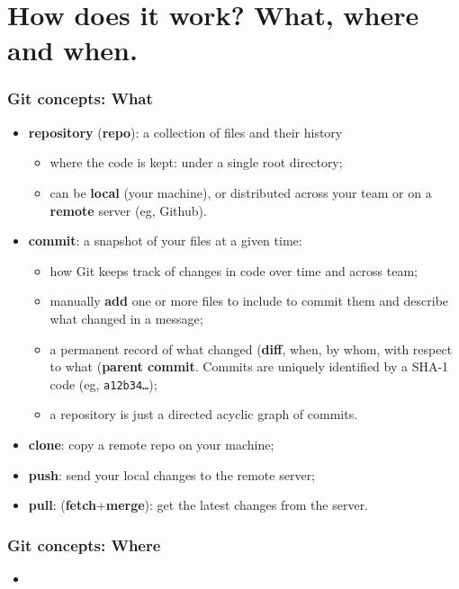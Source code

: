 \documentclass[10pt,svgnames]{beamer}
\begin{document}
\section{How does it work? What, where and when.}
\begin{frame}
\frametitle{Git concepts: What}
    
\begin{itemize}[<+->]
\item \textbf{repository} (\textbf{repo}): a collection of files and their history
\begin{itemize}
   \item where the code is kept: under a single root directory;
   \item can be \textbf{local} (your machine), or distributed across your team or on a \textbf{remote} server (eg, Github).
 \end{itemize}

\item \textbf{commit}: a snapshot of your files at a given time:
\begin{itemize}
  \item how Git keeps track of changes in code over time and across team;
  \item manually \textbf{add} one or more files to include to commit them and describe what changed in a message;
  \item a permanent record of what changed (\textbf{diff}, when, by whom, with respect to what (\textbf{parent commit}. Commits are uniquely identified by a SHA-1 code (eg, \texttt{a12b34\ldots});
  \item a repository is just a directed acyclic graph of commits.
\end{itemize}

\item \textbf{clone}: copy a remote repo on your machine;
\item \textbf{push}: send your local changes to the remote server;
\item \textbf{pull}: (\textbf{fetch}+\textbf{merge}): get the latest changes from the server.
\end{itemize}
\end{frame}

\begin{frame}
\frametitle{Git concepts: Where}

\begin{itemize}
\item \textbf{}
\end{itemize}

    


\end{frame}
\end{document}
